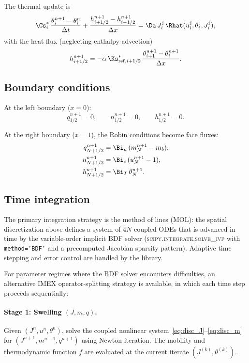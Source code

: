 The thermal update is
\begin{equation}
  \Cs_i^{*}\,\frac{\theta_i^{n+1} - \theta_i^{n}}{\Delta t}
  + \frac{h_{i+1/2}^{n+1} - h_{i-1/2}^{n+1}}{\Delta x}
  = \Da\,J_i^{\sharp}\,\Rhat(u_i^{\sharp},\theta_i^{\sharp},J_i^{\sharp}),
  \label{eq:disc_theta}
\end{equation}
with the heat flux (neglecting enthalpy advection)
\begin{equation}
  h_{i+1/2}^{n+1}
  = -\alpha\,\Ks_{\mathrm{ref},i+1/2}^{*}\,
  \frac{\theta_{i+1}^{n+1} - \theta_i^{n+1}}{\Delta x}.
  \label{eq:disc_h}
\end{equation}

\subsection{Boundary conditions}

At the left boundary ($x=0$):
\begin{equation}
  q_{1/2}^{n+1} = 0,
  \qquad
  n_{1/2}^{n+1} = 0,
  \qquad
  h_{1/2}^{n+1} = 0.
  \label{eq:disc_bc0}
\end{equation}

At the right boundary ($x=1$), the Robin conditions become face fluxes:
\begin{align}
  q_{N+1/2}^{n+1} &= \Bi_\mu\,(m_N^{n+1} - m_b), \label{eq:disc_bc1_q} \\
  n_{N+1/2}^{n+1} &= \Bi_c\,(u_N^{n+1} - 1), \label{eq:disc_bc1_n} \\
  h_{N+1/2}^{n+1} &= \Bi_T\,\theta_N^{n+1}. \label{eq:disc_bc1_h}
\end{align}

\subsection{Time integration}

The primary integration strategy is the method of lines (MOL): the
spatial discretization above defines a system of $4N$ coupled ODEs
that is advanced in time by the variable-order implicit BDF solver
(\textsc{scipy.integrate.solve\_ivp} with \texttt{method='BDF'} and
a precomputed Jacobian sparsity pattern).  Adaptive time stepping
and error control are handled by the library.

For parameter regimes where the BDF solver encounters difficulties,
an alternative IMEX operator-splitting strategy is available, in
which each time step proceeds sequentially:

\paragraph{Stage 1: Swelling $(J,m,q)$.}
Given $(J^n, u^n, \theta^n)$, solve the coupled nonlinear system~\eqref{eq:disc_J}--\eqref{eq:disc_m} for $(J^{n+1}, m^{n+1}, q^{n+1})$ using Newton iteration. The mobility and thermodynamic function $f$ are evaluated at the current iterate $(J^{(k)},\theta^{(k)})$.

